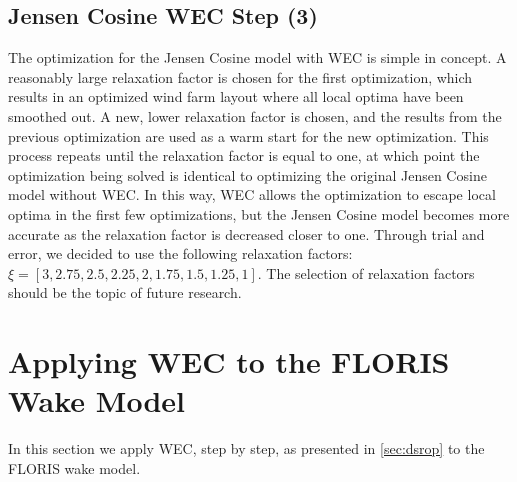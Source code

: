\documentclass[a4paper]{jpconf}
\begin{document}
\subsection{Jensen Cosine WEC Step (3)}

The optimization for the Jensen Cosine model with WEC is simple in concept. A reasonably large relaxation factor is chosen for the first optimization, which results in an optimized wind farm layout where all local optima have been smoothed out. A new, lower relaxation factor is chosen, and the results from the previous optimization are used as a warm start for the new optimization. This process repeats until the relaxation factor is equal to one, at which point the optimization being solved is identical to optimizing the original Jensen Cosine model without WEC. In this way, WEC allows the optimization to escape local optima in the first few optimizations, but the Jensen Cosine model becomes more accurate as the relaxation factor is decreased closer to one. Through trial and error, we decided to use the following relaxation factors: $\xi = [3, 2.75, 2.5, 2.25, 2, 1.75, 1.5, 1.25, 1]$. The selection of relaxation factors should be the topic of future research.

\section{Applying WEC to the FLORIS Wake Model}
In this section we apply WEC, step by step, as presented in \cref{sec:dsrop} to the FLORIS wake model.  

\end{document}
